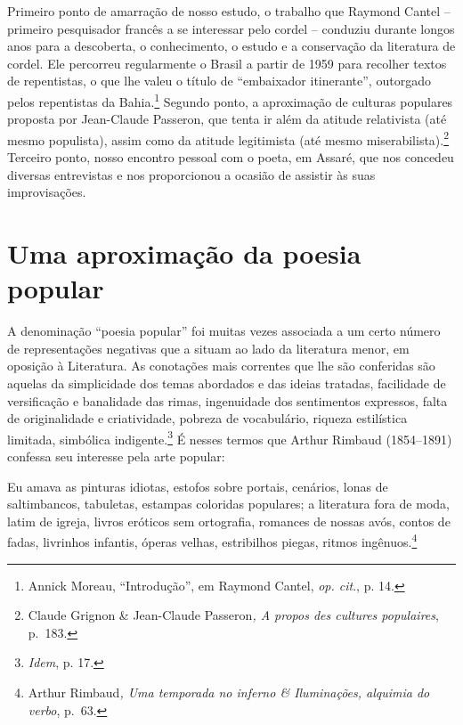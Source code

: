 Primeiro ponto de amarração de nosso estudo, o trabalho que Raymond Cantel --
primeiro pesquisador francês a se interessar pelo cordel -- conduziu durante
longos anos para a descoberta, o conhecimento, o estudo e a conservação da
literatura de cordel. Ele percorreu regularmente o Brasil a partir de 1959 para
recolher textos de repentistas, o que lhe valeu o título de “embaixador
itinerante”, outorgado pelos repentistas da Bahia.\footnote{ Annick Moreau,
“Introdução”, em Raymond Cantel, \textit{op. cit}., p. 14.} Segundo ponto, a
aproximação de culturas populares proposta por Jean-Claude Passeron, que tenta
ir além da atitude relativista (até mesmo populista), assim como da atitude
legitimista (até mesmo miserabilista).\footnote{ Claude Grignon \& Jean-Claude
Passeron\textit{, A propos des cultures populaires}, p.~183.} Terceiro ponto,
nosso encontro pessoal com o poeta, em Assaré, que nos concedeu diversas
entrevistas e nos proporcionou a ocasião de assistir às suas improvisações.

\section{Uma aproximação da poesia popular}

A denominação “poesia popular” foi muitas vezes associada a um certo número de
representações negativas que a situam ao lado da literatura menor, em oposição à
Literatura. As conotações mais correntes que lhe são conferidas são aquelas da
simplicidade dos temas abordados e das ideias tratadas, facilidade de
versificação e banalidade das rimas, ingenuidade dos sentimentos expressos,
falta de originalidade e criatividade, pobreza de vocabulário, riqueza
estilística limitada, simbólica indigente.\footnote{ \textit{Idem}, p. 17.} É
nesses termos que Arthur Rimbaud (1854--1891) confessa seu interesse pela arte
popular:

\begin{hedraquote}
Eu amava as pinturas idiotas, estofos sobre portais, cenários, lonas
de saltimbancos, tabuletas, estampas coloridas populares; a literatura fora de
moda, latim de igreja, livros eróticos sem ortografia, romances de nossas avós,
contos de fadas, livrinhos infantis, óperas velhas, estribilhos piegas, ritmos
ingênuos.\footnote{ Arthur Rimbaud\textit{, Uma temporada no inferno \&
Iluminações, alquimia do verbo}, p.~63.}
\end{hedraquote}

